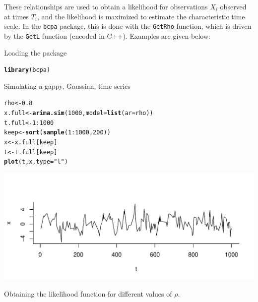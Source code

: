 \documentclass[10pt]{article}\usepackage[]{graphicx}\usepackage[]{color}
\makeatletter
\newcommand{\hlnum}[1]{\textcolor[rgb]{0.686,0.059,0.569}{#1}}%
\newcommand{\hlstr}[1]{\textcolor[rgb]{0.192,0.494,0.8}{#1}}%
\newcommand{\hlopt}[1]{\textcolor[rgb]{0,0,0}{#1}}%
\newcommand{\hlstd}[1]{\textcolor[rgb]{0.345,0.345,0.345}{#1}}%
\newcommand{\hlkwb}[1]{\textcolor[rgb]{0.69,0.353,0.396}{#1}}%
\newcommand{\hlkwc}[1]{\textcolor[rgb]{0.333,0.667,0.333}{#1}}%
\newcommand{\hlkwd}[1]{\textcolor[rgb]{0.737,0.353,0.396}{\textbf{#1}}}%
\newenvironment{kframe}{%
 \def\at@end@of@kframe{}%
 \ifinner\ifhmode%
  \def\at@end@of@kframe{\end{minipage}}%
  \begin{minipage}{\columnwidth}%
 \fi\fi%
 \def\FrameCommand##1{\hskip\@totalleftmargin \hskip-\fboxsep
 \colorbox{shadecolor}{##1}\hskip-\fboxsep
     \hskip-\linewidth \hskip-\@totalleftmargin \hskip\columnwidth}%
 \MakeFramed {\advance\hsize-\width
   \@totalleftmargin\z@ \linewidth\hsize
   \@setminipage}}%
 {\par\unskip\endMakeFramed%
 \at@end@of@kframe}
\newenvironment{knitrout}{}{} %
\makeatother
\begin{document}
These relationships are used to obtain a likelihood for observations $X_i$ observed at times $T_i$, and the likelihood is maximized to estimate the characteristic time scale. In the \texttt{bcpa} package, this is done with the \texttt{GetRho} function, which is driven by the \texttt{GetL} function (encoded in C++).  Examples are given below:

Loading the package
\begin{knitrout}
\color{fgcolor}\begin{kframe}
\begin{alltt}
\hlkwd{library}\hlstd{(bcpa)}
\end{alltt}
\end{kframe}
\end{knitrout}


Simulating a gappy, Gaussian, time series

\begin{knitrout}
\color{fgcolor}\begin{kframe}
\begin{alltt}
\hlstd{rho} \hlkwb{<-} \hlnum{0.8}
\hlstd{x.full} \hlkwb{<-} \hlkwd{arima.sim}\hlstd{(}\hlnum{1000}\hlstd{,} \hlkwc{model} \hlstd{=} \hlkwd{list}\hlstd{(}\hlkwc{ar} \hlstd{= rho))}
\hlstd{t.full} \hlkwb{<-} \hlnum{1}\hlopt{:}\hlnum{1000}
\hlstd{keep} \hlkwb{<-} \hlkwd{sort}\hlstd{(}\hlkwd{sample}\hlstd{(}\hlnum{1}\hlopt{:}\hlnum{1000}\hlstd{,} \hlnum{200}\hlstd{))}
\hlstd{x} \hlkwb{<-} \hlstd{x.full[keep]}
\hlstd{t} \hlkwb{<-} \hlstd{t.full[keep]}
\hlkwd{plot}\hlstd{(t, x,} \hlkwc{type} \hlstd{=} \hlstr{"l"}\hlstd{)}
\end{alltt}
\end{kframe}
\includegraphics[width=\textwidth]{figure/GetRhoDemo1} 

\end{knitrout}


Obtaining the likelihood function for different values of $\rho$.
\end{document}
